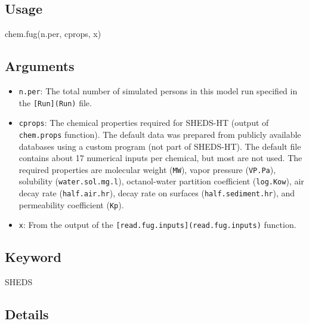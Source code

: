 \documentclass[
]{article}
\newenvironment{Shaded}{\begin{snugshade}}{\end{snugshade}}
\newcommand{\FunctionTok}[1]{\textcolor[rgb]{0.00,0.00,0.00}{#1}}
\newcommand{\NormalTok}[1]{#1}
\providecommand{\tightlist}{%
  \setlength{\itemsep}{0pt}\setlength{\parskip}{0pt}}
\begin{document}
\hypertarget{usage-8}{%
\subsection{Usage}\label{usage-8}}

\begin{Shaded}
\begin{Highlighting}[]
\FunctionTok{chem.fug}\NormalTok{(n.per, cprops, x)}
\end{Highlighting}
\end{Shaded}

\hypertarget{arguments-5}{%
\subsection{Arguments}\label{arguments-5}}

\begin{itemize}
\tightlist
\item
  \texttt{n.per}: The total number of simulated persons in this model
  run specified in the \texttt{{[}Run{]}(Run)} file.
\item
  \texttt{cprops}: The chemical properties required for SHEDS-HT (output
  of \texttt{chem.props} function). The default data was prepared from
  publicly available databases using a custom program (not part of
  SHEDS-HT). The default file contains about 17 numerical inputs per
  chemical, but most are not used. The required properties are molecular
  weight (\texttt{MW}), vapor pressure (\texttt{VP.Pa}), solubility
  (\texttt{water.sol.mg.l}), octanol-water partition coefficient
  (\texttt{log.Kow}), air decay rate (\texttt{half.air.hr}), decay rate
  on surfaces (\texttt{half.sediment.hr}), and permeability coefficient
  (\texttt{Kp}).
\item
  \texttt{x}: From the output of the
  \texttt{{[}read.fug.inputs{]}(read.fug.inputs)} function.
\end{itemize}

\hypertarget{keyword-1}{%
\subsection{Keyword}\label{keyword-1}}

SHEDS

\hypertarget{details-4}{%
\subsection{Details}\label{details-4}}
\end{document}
